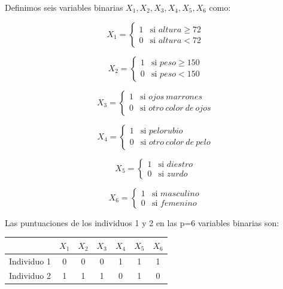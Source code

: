 \documentclass[a4paper, 20pt]{article}
\begin{document}
Definimos seis variables binarias $X_1,X_2,X_3,X_4,X_5,X_6$ como:

$$X_1 = \left \{ \begin{matrix} 1 & \mbox{si } altura \geq 72 
\\ 0 & \mbox{si } altura < 72 \end{matrix}\right.   $$

$$X_2 = \left \{ \begin{matrix} 1 & \mbox{si } peso \geq 150 
\\ 0 & \mbox{si } peso < 150 \end{matrix}\right.   $$

$$X_3 = \left \{ \begin{matrix} 1 & \mbox{si } ojos \ marrones 
\\ 0 & \mbox{si } otro\ color\ de \ ojos\end{matrix}\right.   $$

$$X_4 = \left \{ \begin{matrix} 1 & \mbox{si } pelo rubio
\\ 0 & \mbox{si } otro\ color\ de\ pelo \end{matrix}\right.   $$

$$X_5 = \left \{ \begin{matrix} 1 & \mbox{si } diestro
\\ 0 & \mbox{si } zurdo \end{matrix}\right.   $$

$$X_6 = \left \{ \begin{matrix} 1 & \mbox{si } masculino
\\ 0 & \mbox{si } femenino \end{matrix}\right.   $$

Las puntuaciones de los individuos 1 y 2 en las p=6 variables binarias son:

\begin{table}[h]
\centering
\resizebox{8cm}{!} {
\begin{tabular}{l|cccccc}
            & \multicolumn{1}{l}{$X_1$} & \multicolumn{1}{l}{$X_2$} & \multicolumn{1}{l}{$X_3$} & \multicolumn{1}{l}{$X_4$} & \multicolumn{1}{l}{$X_5$} & \multicolumn{1}{l}{$X_6$} \\ \hline
Individuo 1 & 0                        & 0                        & 0                        & 1                        & 1                        & 1                        \\
Individuo 2 & 1                        & 1                        & 1                        & 0                        & 1                        & 0                       
\end{tabular}
}
\end{table}
\end{document}
